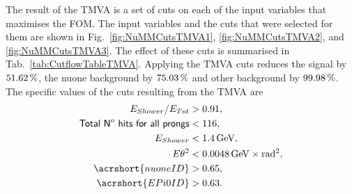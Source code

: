 
The result of the \gls{TMVA} is a set of cuts on each of the input variables that maximises the \gls{FOM}. The input variables and the cuts that were selected for them are shown in Fig.~\ref{fig:NuMMCutsTMVA1}, \ref{fig:NuMMCutsTMVA2}, and \ref{fig:NuMMCutsTMVA3}. The effect of these cuts is summarised in Tab.~\ref{tab:CutflowTableTMVA}. Applying the \gls{TMVA} cuts reduces the signal by $\unit[51.62]{\%}$, the \gls{nuone} background by $\unit[75.03]{\%}$ and other background by $\unit[99.98]{\%}$. The specific values of the cuts resulting from the \gls{TMVA} are
\begin{align}
E_{Shower}/E_{Tot} &> 0.91,\\
\textsf{Total N}^o\textsf{ hits for all prongs} &< 116,\\
E_{Shower} &< \unit[1.4]{GeV},\\
E\theta^2 &< \unit[0.0048]{GeV\times rad^2},\\
\acrshort{nuoneID} &> 0.65,\\
\acrshort{EPi0ID} &> 0.63.
\end{align}

